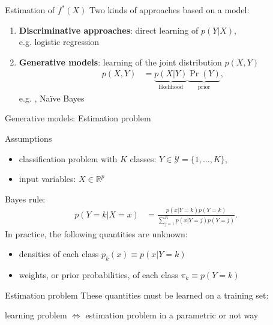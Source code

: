 \begin{frame}{Estimation of $f^{\ast}(X)$}
Two kinds of approaches based on a model:
\begin{enumerate}
 \item \textbf{Discriminative approaches}: direct learning  of $p{(Y|X)}$,\\
   e.g. logistic regression
 \item \textbf{Generative models}: learning of the joint distribution $p(X,Y)$
 \begin{align*}
  p(X,Y) &= \underbrace{p(X|Y)}_{\textrm{likelihood}} \underbrace{\Pr{(Y)}}_{\textrm{prior}},
 \end{align*}
e.g. , Naïve Bayes
\end{enumerate}

\end{frame}



\begin{frame}{Generative models: Estimation problem}
\begin{block}{Assumptions}
 \begin{itemize}
  \item classification problem with $K$ classes: $Y \in \mathcal{Y}=\{1,\ldots,K\}$,
  \item input variables: $X \in \mathbb{R}^p$
 \end{itemize}
\end{block}
 Bayes rule:
  \begin{align*}
 p{(Y=k|X=x)} & = \frac{p(x| Y=k)p{(Y=k)} } { \sum_{j=1}^K p(x|Y=j)p{(Y=j)}  }.
 \end{align*}
 In practice, the following quantities are unknown:
 \begin{itemize}
  \item densities of each class $p_k(x) \equiv p(x| Y=k)$
  \item weights, or prior probabilities, of  each class  $\pi_k \equiv p{(Y=k)}$
 \end{itemize}

\begin{block}{Estimation problem}
 These quantities must be learned on a training set:\\
 \begin{center}
  {learning problem \alert{ $\Leftrightarrow$ estimation problem} in a parametric or not way }
 \end{center}

\end{block}

\end{frame}


